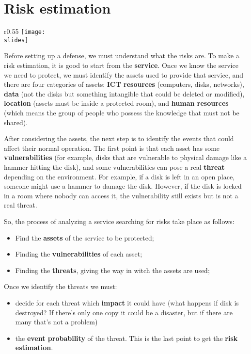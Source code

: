 \section{Risk estimation}

\begin{wrapfigure}{r}{0.55\textwidth}
  \centering
  \texttt{[image: \\slides]}
\end{wrapfigure}

Before setting up a defense, we must understand what the risks are. To make a risk estimation, it is good to start from the \textbf{service}. Once we know the service we need to protect, we must identify the assets used to provide that service, and there are four categories of assets: \textbf{ICT resources} (computers, disks, networks), \textbf{data} (not the disks but something intangible that could be deleted or modified), \textbf{location} (assets must be inside a protected room), and \textbf{human resources} (which means the group of people who possess the knowledge that must not be shared).

After considering the assets, the next step is to identify the events that could affect their normal operation. The first point is that each asset has some \textbf{vulnerabilities} (for example, disks that are vulnerable to physical damage like a hammer hitting the disk), and some vulnerabilities can pose a real \textbf{threat} depending on the environment. For example, if a disk is left in an open place, someone might use a hammer to damage the disk. However, if the disk is locked in a room where nobody can access it, the vulnerability still exists but is not a real threat.

\vspace{5mm}
So, the process of analyzing a service searching for risks take place as follows:
\begin{itemize}[]
  \item Find the \textbf{assets} of the service to be protected;
  \item Finding the \textbf{vulnerabilities} of each asset;
  \item Finding the \textbf{threats}, giving the way in witch the assets are used;
\end{itemize}

\vspace{5mm}
Once we identify the threats we must:
\begin{itemize}
  \item decide for each threat which \textbf{impact} it could have (what happens if disk is destroyed? If there's only one copy it could be a disaster, but if there are many that's not a problem)
  \item the \textbf{event probability} of the threat. This is the last point to get the \textbf{risk estimation}.
\end{itemize}

